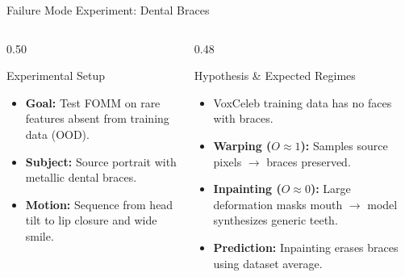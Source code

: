 \begin{frame}{Failure Mode Experiment: Dental Braces}
    \begin{columns}[T]
        \begin{column}{0.50\textwidth}
            \begin{block}{Experimental Setup}
                \small
                \begin{itemize}
                    \item \textbf{Goal:} Test FOMM on rare features absent from training data (OOD).
                    \item \textbf{Subject:} Source portrait with metallic dental braces.
                    \item \textbf{Motion:} Sequence from head tilt to lip closure and wide smile.
                \end{itemize}
            \end{block}
        \end{column}

        \begin{column}{0.48\textwidth}
            \begin{block}{Hypothesis \& Expected Regimes}
                \small
                \begin{itemize}
                    \item VoxCeleb training data has no faces with braces.
                    \item \textbf{Warping ($O \approx 1$):} Samples source pixels $\to$ braces preserved.
                    \item \textbf{Inpainting ($O \approx 0$):} Large deformation masks mouth $\to$ model synthesizes generic teeth.
                    \item \textbf{Prediction:} Inpainting erases braces using dataset average.
                \end{itemize}
            \end{block}
        \end{column}
    \end{columns}
\end{frame}

